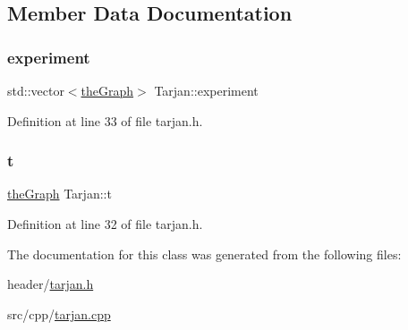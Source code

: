 \subsection{Member Data Documentation}
\mbox{\label{class_tarjan_aaa327f105a07f07648dcc6f62a565986}} 
\subsubsection{\texorpdfstring{experiment}{experiment}}
{\footnotesize\ttfamily std\+::vector$<$\hyperlink{class_graph_component_a982e0748a6e1b8dc74986f5f8b3dca5c}{the\+Graph}$>$ Tarjan\+::experiment}



Definition at line 33 of file tarjan.\+h.

\mbox{\label{class_tarjan_a54b0703f885a3514ea0bf4cdbc7fdaad}} 
\subsubsection{\texorpdfstring{t}{t}}
{\footnotesize\ttfamily \hyperlink{class_graph_component_a982e0748a6e1b8dc74986f5f8b3dca5c}{the\+Graph} Tarjan\+::t}



Definition at line 32 of file tarjan.\+h.



The documentation for this class was generated from the following files\+:\begin{DoxyCompactItemize}
\item 
header/\hyperlink{tarjan_8h}{tarjan.\+h}\item 
src/cpp/\hyperlink{tarjan_8cpp}{tarjan.\+cpp}\end{DoxyCompactItemize}
